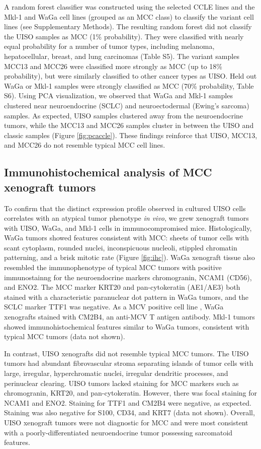 \documentclass[10pt]{article}
\begin{document}
A random forest classifier was constructed using the selected CCLE lines and the Mkl-1 and WaGa cell lines (grouped as an MCC class) to classify the variant cell lines (see Supplementary Methods).
The resulting random forest did not classify the UISO samples as MCC (1\% probability).
They were classified with nearly equal probability for a number of tumor types, including melanoma, hepatocellular, breast, and lung carcinomas (Table S5).
The variant samples MCC13 and MCC26 were classified more strongly as MCC (up to 18\% probability), but were similarly classified to other cancer types as UISO.
Held out WaGa or Mkl-1 samples were strongly classified as MCC (70\% probability, Table S6).
Using PCA visualization, we observed that WaGa and Mkl-1 samples clustered near neuroendocrine (SCLC) and neuroectodermal (Ewing’s sarcoma) samples. 
As expected, UISO samples clustered away from the neuroendocrine tumors, while the MCC13 and MCC26 samples cluster in between the UISO and classic samples (Figure \ref{fig:pcaccle}).
These findings reinforce that UISO, MCC13, and MCC26 do not resemble typical MCC cell lines.

\subsection*{Immunohistochemical analysis of MCC xenograft tumors}
To confirm that the distinct expression profile observed in cultured UISO cells correlates with an atypical tumor phenotype \emph{in vivo}, we grew xenograft tumors with UISO, WaGa, and Mkl-1 cells in immunocompromised mice.
Histologically, WaGa tumors showed features consistent with MCC: sheets of tumor cells with scant cytoplasm, rounded nuclei, inconspicuous nucleoli, stippled chromatin patterning, and a brisk mitotic rate (Figure \ref{fig:ihc}).
WaGa xenograft tissue also resembled the immunophenotype of typical MCC tumors with positive immunostainng for the neuroendocrine markers chromogranin, NCAM1 (CD56), and ENO2.
The MCC marker KRT20 and pan-cytokeratin (AE1/AE3) both stained with a characteristic paranuclear dot pattern in WaGa tumors, and the SCLC marker TTF1 was negative.
As a MCV positive cell line \citep{Houben2010Merkel}, WaGa xenografts stained with CM2B4, an anti-MCV T antigen antibody.
Mkl-1 tumors showed immunohistochemical features similar to WaGa tumors, consistent with typical MCC tumors (data not shown).

In contrast, UISO xenografts did not resemble typical MCC tumors.
The UISO tumors had abundant fibrovascular stroma separating islands of tumor cells with large, irregular, hyperchromatic nuclei, irregular dendritic processes, and perinuclear clearing.
UISO tumors lacked staining for MCC markers such as chromogranin, KRT20, and pan-cytokeratin.
However, there was focal staining for NCAM1 and ENO2.
Staining for TTF1 and CM2B4 were negative, as expected.
Staining was also negative for S100, CD34, and KRT7 (data not shown).
Overall, UISO xenograft tumors were not diagnostic for MCC and were most consistent with a poorly-differentiated neuroendocrine tumor possessing sarcomatoid features.
\end{document}
